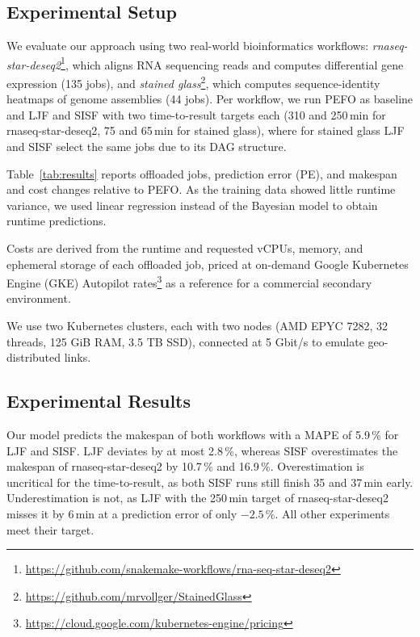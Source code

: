 \subsection{Experimental Setup}
\label{subsec:experimental-setup}

We evaluate our approach using two real-world bioinformatics workflows: \textit{rnaseq-star-deseq2}\footnote{\url{https://github.com/snakemake-workflows/rna-seq-star-deseq2}}, which aligns RNA sequencing reads and computes differential gene expression (135 jobs), and \textit{stained glass}\footnote{\url{https://github.com/mrvollger/StainedGlass}}, which computes sequence-identity heatmaps of genome assemblies (44 jobs). Per workflow, we run PEFO as baseline and LJF and SISF with two time-to-result targets each (310 and 250\,min for rnaseq-star-deseq2, 75 and 65\,min for stained glass), where for stained glass LJF and SISF select the same jobs due to its DAG structure.

Table~\ref{tab:results} reports offloaded jobs, prediction error (PE), and makespan and cost changes relative to PEFO. As the training data showed little runtime variance, we used linear regression instead of the Bayesian model to obtain runtime predictions.

Costs are derived from the runtime and requested vCPUs, memory, and ephemeral storage of each offloaded job, priced at on-demand Google Kubernetes Engine (GKE) Autopilot rates\footnote{\url{https://cloud.google.com/kubernetes-engine/pricing}} as a reference for a commercial secondary environment.

We use two Kubernetes clusters, each with two nodes (AMD EPYC 7282, 32 threads, 125 GiB RAM, 3.5 TB SSD), connected at 5 Gbit/s to emulate geo-distributed links.

\subsection{Experimental Results}
\label{subsec:experimental-results}
Our model predicts the makespan of both workflows with a MAPE of 5.9\,\% for LJF and SISF. LJF deviates by at most 2.8\,\%, whereas SISF overestimates the makespan of rnaseq-star-deseq2 by 10.7\,\% and 16.9\,\%.
Overestimation is uncritical for the time-to-result, as both SISF runs still finish 35 and 37\,min early. Underestimation is not, as LJF with the 250\,min target of rnaseq-star-deseq2 misses it by 6\,min at a prediction error of only $-2.5$\,\%. All other experiments meet their target.

